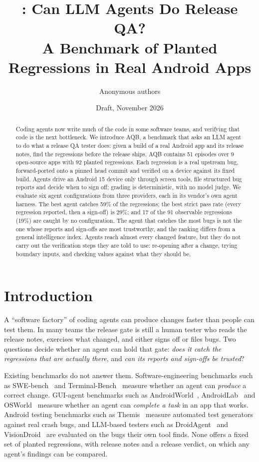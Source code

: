 \documentclass[11pt]{article}
\title{\aqb: Can LLM Agents Do Release QA?\\[2pt]
\large A Benchmark of Planted Regressions in Real Android Apps}
\author{Anonymous authors}
\date{Draft, November 2026}
\newcommand{\aqb}{\textsc{AQB}}
\begin{document}
\maketitle

\begin{abstract}
Coding agents now write much of the code in some software teams, and verifying that code is the
next bottleneck. We introduce \aqb{}, a benchmark that asks an LLM agent to do what a release QA
tester does: given a build of a real Android app and its release notes, find the regressions
before the release ships. \aqb{} contains 51 episodes over 9 open-source apps with 92 planted
regressions. Each regression is a real upstream bug, forward-ported onto a pinned head commit and
verified on a device against its fixed build. Agents drive an Android 15 device only through
screen tools, file structured bug reports and decide when to sign off; grading is deterministic,
with no model judge. We evaluate six agent configurations from three providers, each in its
vendor's own agent harness. The best agent catches 59\% of the regressions; the best strict pass
rate (every regression reported, then a sign-off) is 29\%; and 17 of the 91 observable regressions
(19\%) are caught by no configuration. The agent that catches the most bugs is not the one whose reports and
sign-offs are most trustworthy, and the ranking differs from a general intelligence index.
Agents reach almost every changed feature, but they do not carry out the verification steps
they are told to use: re-opening after a change, trying boundary inputs, and checking values
against what they should be.
\end{abstract}

\section{Introduction}

A ``software factory'' of coding agents can produce changes faster than people can test them. In
many teams the release gate is still a human tester who reads the release notes, exercises what
changed, and either signs off or files bugs. Two questions decide whether an agent can hold that
gate: \emph{does it catch the regressions that are actually there}, and \emph{can its reports and
sign-offs be trusted}?

Existing benchmarks do not answer them. Software-engineering benchmarks such as
SWE-bench~\cite{jimenez2024swebench} and Terminal-Bench~\cite{merrill2026terminalbench} measure
whether an agent can \emph{produce} a correct change. GUI-agent benchmarks such as
AndroidWorld~\cite{rawles2025androidworld}, AndroidLab~\cite{xu2024androidlab} and
OSWorld~\cite{xie2024osworld} measure whether an agent can \emph{complete a task} in an app that
works. Android testing benchmarks such as Themis~\cite{su2021themis} measure automated test
generators against real crash bugs, and LLM-based testers such as DroidAgent~\cite{yoon2024droidagent}
and VisionDroid~\cite{liu2025visiondroid} are evaluated on the bugs their own tool finds. None offers a
fixed set of planted regressions, with release notes and a release verdict, on which any agent's
findings can be compared.
\end{document}
